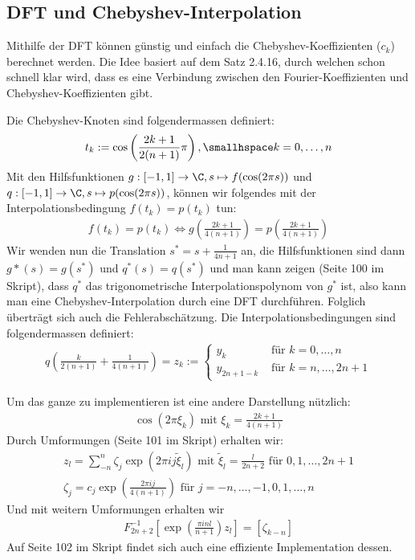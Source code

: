 \newsection
\subsection{DFT und Chebyshev-Interpolation}
Mithilfe der DFT können günstig und einfach die Chebyshev-Koeffizienten ($c_k$) berechnet werden.
Die Idee basiert auf dem Satz 2.4.16, durch welchen schon schnell klar wird, dass es eine Verbindung zwischen den Fourier-Koeffizienten und Chebyshev-Koeffizienten gibt.

Die Chebyshev-Knoten sind folgendermassen definiert:
\begin{align*}
    t_k := \cos\left( \frac{2k + 1}{2(n + 1)} \pi \right), \smallhspace k = 0, \ldots, n
\end{align*}
Mit den Hilfsfunktionen $g: [-1, 1] \rightarrow \C, s \mapsto f(\cos(2\pi s))$ und $q: [-1, 1] \rightarrow \C, s \mapsto p(\cos(2\pi s))$,
können wir folgendes mit der Interpolationsbedingung $f(t_k) = p(t_k)$ tun:
\begin{align*}
    f(t_k) = p(t_k) \Longleftrightarrow g\left( \frac{2k + 1}{4(n + 1)} \right) = p\left( \frac{2k + 1}{4(n + 1)} \right)
\end{align*}
Wir wenden nun die Translation $s^* = s + \frac{1}{4n + 1}$ an, die Hilfsfunktionen sind dann $g*(s) = g(s^*)$ und $q^*(s) = q(s^*)$
und man kann zeigen (Seite 100 im Skript), dass $q^*$ das trigonometrische Interpolationspolynom von $g^*$ ist,
also kann man eine Chebyshev-Interpolation durch eine DFT durchführen.
Folglich überträgt sich auch die Fehlerabschätzung. Die Interpolationsbedingungen sind folgendermassen definiert:
\begin{align*}
    q\left( \frac{k}{2(n + 1)} + \frac{1}{4(n + 1)} \right) = z_k :=
    \begin{cases}
        y_k            & \text{ für } k = 0, \ldots, n \\
        y_{2n + 1 - k} & \text{ für } k = n, \ldots, 2n + 1
    \end{cases}
\end{align*}

Um das ganze zu implementieren ist eine andere Darstellung nützlich:
\begin{align*}
    \cos(2\pi \xi_k) \text{ mit } \xi_k = \frac{2k + 1}{4(n + 1)}
\end{align*}
Durch Umformungen (Seite 101 im Skript) erhalten wir:
\begin{align*}
    z_l = \sum_{-n}^{n} \zeta_j \exp\left( 2\pi ij \tilde{\xi}_l \right) \text{ mit } \tilde{\xi}_l = \frac{l}{2n + 2} \text{ für } 0, 1, \ldots, 2n + 1\\
    \zeta_j = c_j \exp\left( \frac{2 \pi ij}{4(n + 1)} \right) \text{ für } j = -n, \ldots, -1, 0, 1, \ldots, n
\end{align*}
Und mit weitern Umformungen erhalten wir
\begin{align*}
    F^{-1}_{2n + 2} \left[ \exp\left( \frac{\pi inl}{n + 1} \right) z_l \right] = [\zeta_{k -n}]
\end{align*}
Auf Seite 102 im Skript findet sich auch eine effiziente Implementation dessen.

